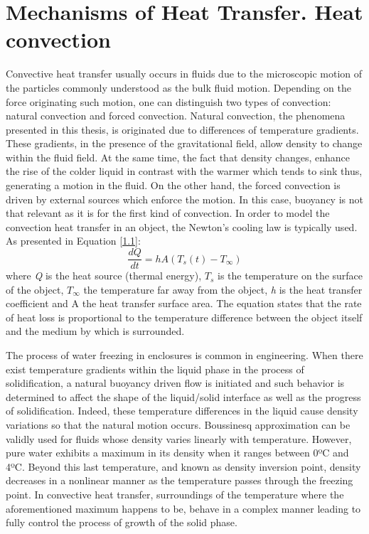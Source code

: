 \section{Mechanisms of Heat Transfer. Heat convection}

Convective heat transfer usually occurs in fluids due to the microscopic motion of the particles commonly understood as the bulk fluid motion.
\newline
Depending on the force originating such motion, one can distinguish two types of convection: natural convection and forced convection. Natural convection, the phenomena presented in this thesis, is originated due to differences of temperature gradients. These gradients, in the presence of the gravitational field, allow density to change within the fluid field. At the same time, the fact that density changes, enhance the rise of the colder liquid in contrast with the warmer which tends to sink thus, generating a motion in the fluid. On the other hand, the forced convection is driven by external sources which enforce the motion. In this case, buoyancy is not that relevant as it is for the first kind of convection. 
\newline
In order to model the convection heat transfer in an object, the Newton's cooling law is typically used. As presented in Equation \ref{1.1}:
\begin{equation}
\frac{d Q}{d t}=h A\left(T_{s}(t)-T_{\infty}\right)
\label{1.1}
\end{equation}
where \textit{Q} is the heat source (thermal energy), $T_s$ is the temperature on the surface of the object, $T_{\infty}$ the temperature far away from the object, \textit{h} is the heat transfer coefficient and A the heat transfer surface area.
\newline
The equation states that the rate of heat loss is proportional to the temperature difference between the object itself and the medium by which is surrounded.
\newline

The process of water freezing in enclosures is common in engineering. When there exist temperature gradients within the liquid phase in the process of solidification, a natural buoyancy driven flow is initiated and such behavior is determined to affect the shape of the liquid/solid interface as well as the progress of solidification.
\newline
Indeed, these temperature differences in the liquid cause density variations so that the natural motion occurs. Boussinesq approximation can be validly used for fluids whose density varies linearly with temperature. However, pure water exhibits a maximum in its density when it ranges between 0ºC and 4ºC. Beyond this last temperature, and known as density inversion point, density decreases in a nonlinear manner as the temperature passes through the freezing point. In convective heat transfer, surroundings of the temperature where the aforementioned maximum happens to be, behave in a complex manner leading to fully control the process of growth of the solid phase.


